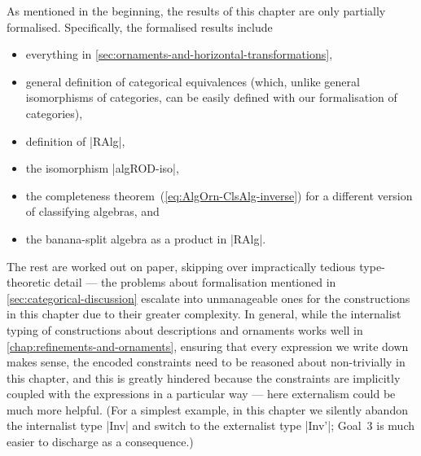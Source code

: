 As mentioned in the beginning, the results of this chapter are only partially formalised.
Specifically, the formalised results include
\begin{itemize}
\item everything in \autoref{sec:ornaments-and-horizontal-transformations},
\item general definition of categorical equivalences (which, unlike general isomorphisms of categories, can be easily defined with our formalisation of categories),
\item definition of |RAlg|,
\item the isomorphism |algROD-iso|,
\item the completeness theorem~(\ref{eq:AlgOrn-ClsAlg-inverse}) for a different version of classifying algebras, and
\item the banana-split algebra as a product in |RAlg|.
\end{itemize}
The rest are worked out on paper, skipping over impractically tedious type-theoretic detail --- the problems about formalisation mentioned in \autoref{sec:categorical-discussion} escalate into unmanageable ones for the constructions in this chapter due to their greater complexity.
In general, while the internalist typing of constructions about descriptions and ornaments works well in \autoref{chap:refinements-and-ornaments}, ensuring that every expression we write down makes sense, the encoded constraints need to be reasoned about non-trivially in this chapter, and this is greatly hindered because the constraints are implicitly coupled with the expressions in a particular way --- here externalism could be much more helpful.
(For a simplest example, in this chapter we silently abandon the internalist type |Inv| and switch to the externalist type |Inv'|; Goal~3 is much easier to discharge as a consequence.)

